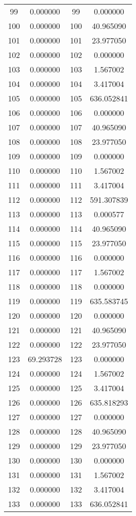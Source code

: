 \documentclass[12pt]{article}
\begin{document}
\begin{longtable}{@{}cccc@{}}
99 & 0.000000 & 99 & 0.000000 \\
100 & 0.000000 & 100 & 40.965090 \\
101 & 0.000000 & 101 & 23.977050 \\
102 & 0.000000 & 102 & 0.000000 \\
103 & 0.000000 & 103 & 1.567002 \\
104 & 0.000000 & 104 & 3.417004 \\
105 & 0.000000 & 105 & 636.052841 \\
106 & 0.000000 & 106 & 0.000000 \\
107 & 0.000000 & 107 & 40.965090 \\
108 & 0.000000 & 108 & 23.977050 \\
109 & 0.000000 & 109 & 0.000000 \\
110 & 0.000000 & 110 & 1.567002 \\
111 & 0.000000 & 111 & 3.417004 \\
112 & 0.000000 & 112 & 591.307839 \\
113 & 0.000000 & 113 & 0.000577 \\
114 & 0.000000 & 114 & 40.965090 \\
115 & 0.000000 & 115 & 23.977050 \\
116 & 0.000000 & 116 & 0.000000 \\
117 & 0.000000 & 117 & 1.567002 \\
118 & 0.000000 & 118 & 0.000000 \\
119 & 0.000000 & 119 & 635.583745 \\
120 & 0.000000 & 120 & 0.000000 \\
121 & 0.000000 & 121 & 40.965090 \\
122 & 0.000000 & 122 & 23.977050 \\
123 & 69.293728 & 123 & 0.000000 \\
124 & 0.000000 & 124 & 1.567002 \\
125 & 0.000000 & 125 & 3.417004 \\
126 & 0.000000 & 126 & 635.818293 \\
127 & 0.000000 & 127 & 0.000000 \\
128 & 0.000000 & 128 & 40.965090 \\
129 & 0.000000 & 129 & 23.977050 \\
130 & 0.000000 & 130 & 0.000000 \\
131 & 0.000000 & 131 & 1.567002 \\
132 & 0.000000 & 132 & 3.417004 \\
133 & 0.000000 & 133 & 636.052841 \\

\end{longtable}
\end{document}
